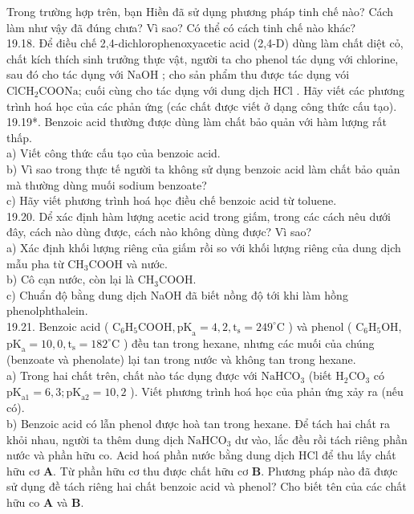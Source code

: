 \documentclass[10pt]{article}
\begin{document}
Trong trường hợp trên, bạn Hiền đã sử dụng phương pháp tinh chế nào? Cách làm như vậy đã đúng chưa? Vì sao? Có thể có cách tinh chế nào khác?\\
19.18. Để điều chế 2,4-dichlorophenoxyacetic acid (2,4-D) dùng làm chất diệt cỏ, chất kích thích sinh trưởng thực vật, người ta cho phenol tác dụng với chlorine, sau đó cho tác dụng với NaOH ; cho sản phẩm thu được tác dụng vói $\mathrm{ClCH}_{2} \mathrm{COONa}$; cuối cùng cho tác dụng với dung dịch HCl . Hãy viết các phương trình hoá học của các phản ứng (các chất được viết ở dạng công thức cấu tạo).\\
19.19*. Benzoic acid thường được dùng làm chất bảo quản với hàm lượng rất thấp.\\
a) Viết công thức cấu tạo của benzoic acid.\\
b) Vì sao trong thực tế người ta không sử dụng benzoic acid làm chất bảo quản mà thường dùng muối sodium benzoate?\\
c) Hãy viết phương trình hoá học điều chế benzoic acid từ toluene.\\
19.20. Dể xác định hàm lượng acetic acid trong giấm, trong các cách nêu dưới đây, cách nào dùng được, cách nào không dùng được? Vì sao?\\
a) Xác định khối lượng riêng của giấm rồi so với khối lượng riêng của dung dịch mẫu pha từ $\mathrm{CH}_{3} \mathrm{COOH}$ và nước.\\
b) Cô cạn nước, còn lại là $\mathrm{CH}_{3} \mathrm{COOH}$.\\
c) Chuẩn độ bằng dung dịch NaOH đã biết nồng độ tới khi làm hồng phenolphthalein.\\
19.21. Benzoic acid ( $\mathrm{C}_{6} \mathrm{H}_{5} \mathrm{COOH}, \mathrm{pK}_{\mathrm{a}}=4,2, \mathrm{t}_{\mathrm{s}}=249^{\circ} \mathrm{C}$ ) và phenol ( $\mathrm{C}_{6} \mathrm{H}_{5} \mathrm{OH}$, $\mathrm{pK}_{\mathrm{a}}=10,0, \mathrm{t}_{\mathrm{s}}=182^{\circ} \mathrm{C}$ ) đều tan trong hexane, nhưng các muối của chúng (benzoate và phenolate) lại tan trong nước và không tan trong hexane.\\
a) Trong hai chất trên, chất nào tác dụng được với $\mathrm{NaHCO}_{3}$ (biết $\mathrm{H}_{2} \mathrm{CO}_{3}$ có $\mathrm{pK}_{\mathrm{a} 1}=6,3 ; \mathrm{pK}_{\mathrm{a} 2}=10,2$ ). Viết phương trình hoá học của phản ứng xảy ra (nếu có).\\
b) Benzoic acid có lẫn phenol được hoà tan trong hexane. Để tách hai chất ra khỏi nhau, người ta thêm dung dịch $\mathrm{NaHCO}_{3}$ dư vào, lắc đều rồi tách riêng phần nước và phần hữu co. Acid hoá phần nước bằng dung dịch HCl để thu lấy chất hữu cơ $\mathbf{A}$. Từ phần hữu cơ thu được chất hữu cơ $\mathbf{B}$. Phương pháp nào đã được sử dụng đề tách riêng hai chất benzoic acid và phenol? Cho biết tên của các chất hữu co $\mathbf{A}$ và $\mathbf{B}$.\\
\end{document}
